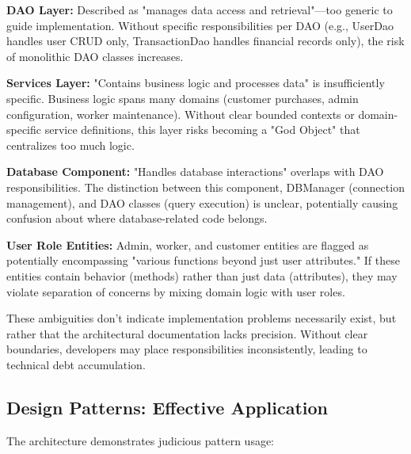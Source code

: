 \documentclass[11pt,a4paper]{article}
\begin{document}
\begin{tcolorbox}[colback=criticalred!5,colframe=criticalred,title=\textbf{Single Responsibility Principle Violations}]
\textbf{DAO Layer:} Described as "manages data access and retrieval"—too generic to guide implementation. Without specific responsibilities per DAO (e.g., UserDao handles user CRUD only, TransactionDao handles financial records only), the risk of monolithic DAO classes increases.

\textbf{Services Layer:} "Contains business logic and processes data" is insufficiently specific. Business logic spans many domains (customer purchases, admin configuration, worker maintenance). Without clear bounded contexts or domain-specific service definitions, this layer risks becoming a "God Object" that centralizes too much logic.

\textbf{Database Component:} "Handles database interactions" overlaps with DAO responsibilities. The distinction between this component, DBManager (connection management), and DAO classes (query execution) is unclear, potentially causing confusion about where database-related code belongs.

\textbf{User Role Entities:} Admin, worker, and customer entities are flagged as potentially encompassing "various functions beyond just user attributes." If these entities contain behavior (methods) rather than just data (attributes), they may violate separation of concerns by mixing domain logic with user roles.
\end{tcolorbox}

These ambiguities don't indicate implementation problems necessarily exist, but rather that the architectural documentation lacks precision. Without clear boundaries, developers may place responsibilities inconsistently, leading to technical debt accumulation.

\subsection{Design Patterns: Effective Application}

The architecture demonstrates judicious pattern usage:
\end{document}
